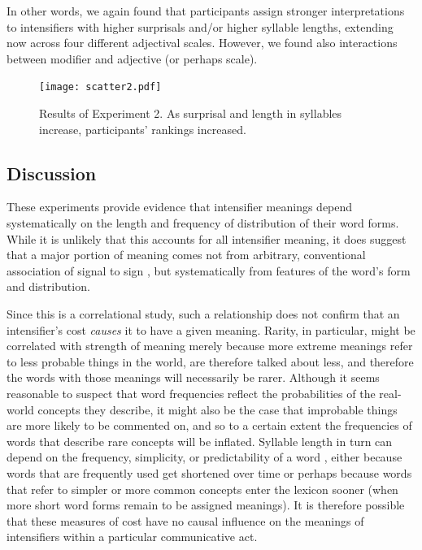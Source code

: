 \documentclass[10pt,letterpaper]{article}
\begin{document}
In other words, we again found that participants assign stronger interpretations to intensifiers with higher surprisals and/or higher syllable lengths, extending now across four different adjectival scales. However, we found also interactions between modifier and adjective (or perhaps scale).

\begin{figure}[hbt]
\begin{center}
\texttt{[image: scatter2.pdf]}
\end{center}
\caption{Results of Experiment 2. As surprisal and length in syllables increase, participants' rankings increased.} 
\label{exp2-plot}
\end{figure}

\subsection{Discussion}    
These experiments provide evidence that intensifier meanings depend systematically on the length and frequency of distribution of their word forms.
While it is unlikely that this accounts for all intensifier meaning, it does suggest that a major portion of meaning comes not from arbitrary, conventional association of signal to sign \cite{de_saussure_nature_1916}, but systematically from features of the word's form and distribution.

Since this is a correlational study, such a relationship does not confirm that an intensifier's cost \emph{causes} it to have a given meaning.
Rarity, in particular, might be correlated with strength of meaning merely because more extreme meanings refer to less probable things in the world, are therefore talked about less, and therefore the words with those meanings will necessarily be rarer.
Although it seems reasonable to suspect that word frequencies reflect the probabilities of the real-world concepts they describe, it might also be the case that improbable things are more likely to be commented on, and so to a certain extent the frequencies of words that describe rare concepts will be inflated. Syllable length in turn can depend on the frequency, simplicity, or predictability of a word \cite{zipf_psycho-biology_1935, lewis_conceptual_2016, mahowald_info/information_2013}, either because words that are frequently used get shortened over time \cite{kanwal_evolution_2016} or perhaps because words that refer to simpler or more common concepts enter the lexicon sooner (when more short word forms remain to be assigned meanings). It is therefore possible that these measures of cost have no causal influence on the meanings of intensifiers within a particular communicative act.
\end{document}
